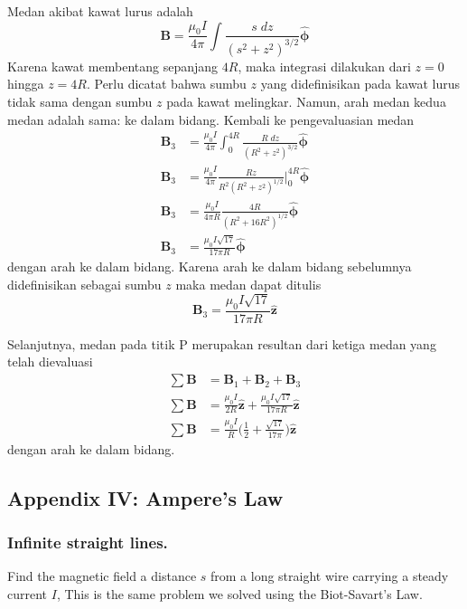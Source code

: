 \documentclass[../../../main.tex]{subfiles}
\begin{document}
Medan akibat kawat lurus adalah
\begin{equation*}
    \mathbf{B} =\frac{\mu_0 I}{4\pi}\int \frac{s\;dz}{(s^2+z^2)^{3/2}}\boldsymbol{\hat{\phi}}
\end{equation*}
Karena kawat membentang sepanjang $4R$, maka integrasi dilakukan dari $z=0$ hingga $z= 4R$. Perlu dicatat bahwa sumbu $z$ yang didefinisikan pada kawat lurus tidak sama dengan sumbu $z$ pada kawat melingkar. Namun, arah medan kedua medan adalah sama: ke dalam bidang. Kembali ke pengevaluasian medan 
\begin{align*}
    \mathbf{B}_3 &=\frac{\mu_0 I}{4\pi}\int_{0}^{4R} \frac{R\;dz}{(R^2+z^2)^{3/2}}\boldsymbol{\hat{\phi}}\\
    \mathbf{B}_3&=\frac{\mu_0 I}{4\pi}\frac{Rz}{R^2(R^2+z^2)^{1/2}}\bigg|_{0}^{4R}\boldsymbol{\hat{\phi}}\\
    \mathbf{B}_3&=\frac{\mu_0 I}{4\pi R}\frac{4R}{(R^2+16R^2)^{1/2}}\boldsymbol{\hat{\phi}}\\
    \mathbf{B}_3&=\frac{\mu_0 I\sqrt{17}}{17\pi R} \boldsymbol{\hat{\phi}}
\end{align*}
dengan arah ke dalam bidang. Karena arah ke dalam bidang sebelumnya didefinisikan sebagai sumbu $z$ maka medan dapat ditulis
\begin{equation*}
    \mathbf{B}_3=\frac{\mu_0 I\sqrt{17}}{17\pi R} \mathbf{\hat{z}}
\end{equation*}

Selanjutnya, medan pada titik P merupakan resultan dari ketiga medan yang telah dievaluasi
\begin{align*}
    \sum \mathbf{B}& =\mathbf{B}_1+\mathbf{B}_2+\mathbf{B}_3\\
    \sum \mathbf{B}& =\frac{\mu_0 I}{2R}\mathbf{\hat{z}}+\frac{\mu_0 I\sqrt{17}}{17\pi R} \mathbf{\hat{z}}\\
    \sum \mathbf{B}& =\frac{\mu_0 I}{R}\biggl(\frac{1}{2}+\frac{\sqrt{17}}{17\pi}\biggr)\mathbf{\hat{z}}
\end{align*}
dengan arah ke dalam bidang.

\subsection*{Appendix IV: Ampere's Law}
\subsubsection*{Inﬁnite straight lines.} Find the magnetic ﬁeld a distance $s$ from a long straight wire carrying a steady current $I$, This is the same problem we solved using the Biot-Savart's Law. 
\end{document}
